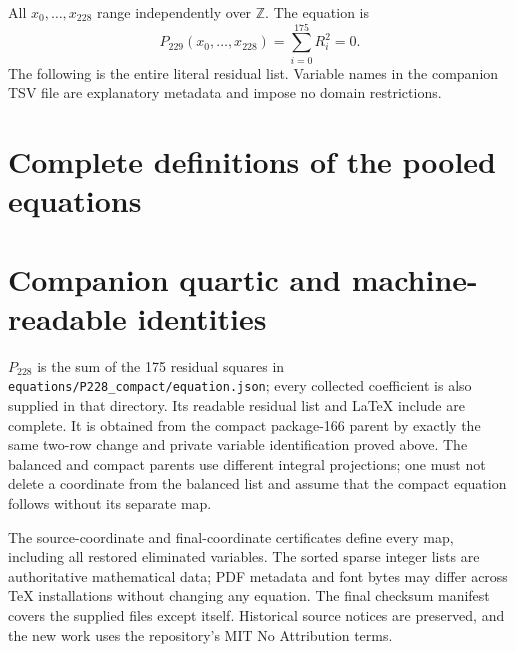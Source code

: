 \documentclass[10pt,letterpaper]{article}
\theoremstyle{definition}\newtheorem{definition}[theorem]{Definition}
\theoremstyle{remark}\newtheorem{remark}[theorem]{Remark}
\newcommand{\Z}{\mathbb Z}\newcommand{\N}{\mathbb N}\newcommand{\Q}{\mathbb Q}
\begin{document}
All $x_0,\ldots,x_{228}$ range independently over $\Z$. The equation is
\[
 P_{229}(x_0,\ldots,x_{228})=\sum_{i=0}^{175}R_i^2=0.
\]
The following is the entire literal residual list. Variable names in
the companion TSV file are explanatory metadata and impose no domain
restrictions.


\section{Complete definitions of the pooled equations}


\section{Companion quartic and machine-readable identities}

$P_{228}$ is the sum of the 175 residual squares in
\texttt{equations/P228\_compact/equation.json}; every collected coefficient
is also supplied in that directory. Its readable residual list and
LaTeX include are complete. It is obtained from the compact package-166
parent by exactly the same two-row change and private variable
identification proved above. The balanced and compact parents use
different integral projections; one must not delete a coordinate from
the balanced list and assume that the compact equation follows without
its separate map.

The source-coordinate and final-coordinate certificates define every
map, including all restored eliminated variables. The sorted sparse
integer lists are authoritative mathematical data; PDF metadata and
font bytes may differ across TeX installations without changing any
equation. The final checksum manifest covers the supplied files except
itself. Historical source notices are preserved, and the new work uses
the repository's MIT No Attribution terms.
\end{document}
